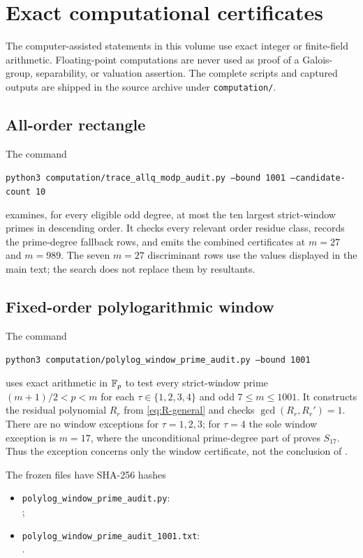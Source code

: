 \section{Exact computational certificates}
\label{app:computational-certificates}

The computer-assisted statements in this volume use exact integer or
finite-field arithmetic.  Floating-point computations are never used as
proof of a Galois-group, separability, or valuation assertion.  The complete
scripts and captured outputs are shipped in the source archive under
\nolinkurl{computation/}.

\subsection{All-order rectangle}

The command
\begin{center}
\texttt{python3 computation/trace\_allq\_modp\_audit.py
  --bound 1001 --candidate-count 10}
\end{center}
examines, for every eligible odd degree, at most the ten largest
strict-window primes in descending order.  It checks every relevant order
residue class, records the prime-degree fallback rows, and emits the combined
certificates at \(m=27\) and \(m=989\).  The seven \(m=27\) discriminant
rows use the values displayed in the main text; the search does not replace
them by resultants.

\subsection{Fixed-order polylogarithmic window}

The command
\begin{center}
\texttt{python3 computation/polylog\_window\_prime\_audit.py
  --bound 1001}
\end{center}
uses exact arithmetic in $\mathbb F_p$ to test every strict-window prime
$(m+1)/2<p<m$ for each $\tau\in\{1,2,3,4\}$ and odd
$7\le m\le1001$.  It constructs the residual polynomial $R_r$ from
\eqref{eq:R-general} and checks $\gcd(R_r,R_r')=1$.  There are no window
exceptions for $\tau=1,2,3$; for $\tau=4$ the sole window exception is
$m=17$, where the unconditional prime-degree part of
 proves $S_{17}$.  Thus the exception concerns only
the window certificate, not the conclusion of .

The frozen files have SHA-256 hashes
\begin{itemize}
\item \nolinkurl{polylog_window_prime_audit.py}:\\
\texttt{\small{}};
\item \nolinkurl{polylog_window_prime_audit_1001.txt}:\\
\texttt{\small{}}.
\end{itemize}

